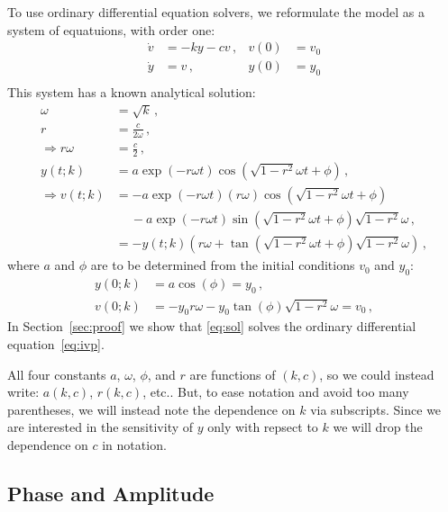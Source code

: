 \documentclass[utf8,english,DIV=12]{scrartcl}
\begin{document}
To use ordinary differential equation solvers, we reformulate the
model as a system of equatuions, with order one:
\begin{align}
  \dot v&=-ky -c v\,,&v(0)&=v_0\label{eq:y}\\
  \dot y&=v\,,&y(0)&=y_0\label{eq:v}\\
\end{align}
This system has a known analytical solution:
\begin{equation}
  \label{eq:sol}
  \begin{split}
    \omega&=\sqrt{k}\,,\\
    r&=\frac{c}{2\omega}\,,\\
    \Rightarrow r\omega&=\frac{c}{2}\,,\\
    y(t;k)&=a\exp(-r\omega t)\cos(\sqrt{1-r^2}\omega t+\phi)\,,\\
    \Rightarrow v(t;k)&=-a\exp(-r\omega t)(r\omega)\cos(\sqrt{1-r^2}\omega t+\phi)\\
    &\quad~- a\exp(-r\omega t)\sin(\sqrt{1-r^2}\omega t+\phi) \sqrt{1-r^2}\omega\,,\\
    &=-y(t;k)\left(r\omega + \tan(\sqrt{1-r^2}\omega t+\phi) \sqrt{1-r^2}\omega\right)\,,
  \end{split}
\end{equation}
where $a$ and $\phi$ are to be determined from the initial conditions
$v_0$ and $y_0$:
\begin{equation}
  \label{eq:init}
  \begin{split}
    y(0;k)&=a\cos(\phi)=y_0\,,\\
    v(0;k)&=-y_0r\omega-y_0\tan(\phi)\sqrt{1-r^2}\omega=v_0 \,,
  \end{split}
\end{equation}
In Section~\ref{sec:proof} we show that \eqref{eq:sol} solves the
ordinary differential equation~\eqref{eq:ivp}.

All four constants $a$, $\omega$, $\phi$, and $r$ are functions of $(k,c)$, so we could instead write:
$a(k,c)$, $r(k,c)$, etc.. But, to ease notation and avoid too many
parentheses, we will instead note the dependence on $k$ via
subscripts. Since we are interested in the sensitivity of $y$ only
with repsect to $k$ we will drop the dependence on $c$ in notation.

\subsection{Phase and Amplitude}
\label{sec:aphi}
\end{document}
